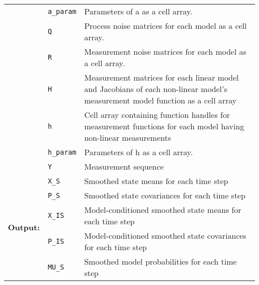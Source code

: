 \begin{tabular*}{\textwidth}{@{\extracolsep{\fill}} | p{} p{} p{} |  }
 & \texttt{a\_param} & Parameters of a as a cell array. \\
 & \texttt{Q} & Process noise matrices for each model as a cell array. \\
 & \texttt{R} & Measurement noise matrices for each model as a cell array. \\
 & \texttt{H} & Measurement matrices for each linear model and Jacobians of each
            non-linear model's measurement model function as a cell array \\
 & \texttt{h} & Cell array containing function handles for measurement functions
            for each model having non-linear measurements \\
 & \texttt{h\_param} & Parameters of h as a cell array. \\
 & \texttt{Y} & Measurement sequence \\
\hline
\multirow{5}{*}{\bf Output:}
 & \texttt{X\_S} & Smoothed state means for each time step \\
 & \texttt{P\_S} & Smoothed state covariances for each time step \\
 & \texttt{X\_IS} & Model-conditioned smoothed state means for each time step \\
 & \texttt{P\_IS} & Model-conditioned smoothed state covariances for each time step \\
 & \texttt{MU\_S} & Smoothed model probabilities for each time step
     \\
\hline
\end{tabular*}
